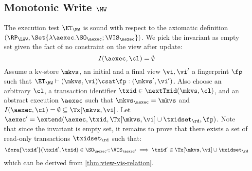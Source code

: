 \subsection{Monotonic Write \( \MW \)}
\label{sec:sound-complete-mw}

The execution test $\ET_\MW$ is sound with respect to the axiomatic definition 
$(\RP_{\LWW}, \Set{\lambda \aexec. \SO_{\aexec} ; \VIS_{\aexec} })$.
We pick the invariant as empty set given the fact of no constraint on the view after update:
\[ 
    I( \aexec, \cl ) = \emptyset 
\]
Assume a kv-store $\mkvs$, an initial and a final view $\vi, \vi'$  a fingerprint $\fp$ 
such that $\ET_{\MW} \vdash (\mkvs, \vi) \csat \fp: (\mkvs',\vi')$. 
Also choose an arbitrary $\cl$, a transaction identifier $\txid \in \nextTxid(\mkvs, \cl)$, 
and an abstract execution $\aexec$ such that $\mkvs_{\aexec} = \mkvs$ and 
\( I(\aexec, \cl) =  \emptyset \subseteq \Tx[\mkvs, \vi] \).
Let \( \aexec' = \extend(\aexec, \txid, \Tx[\mkvs, \vi] \cup \txidset_\rd, \fp ) \).
Note that since the invariant  is empty set, it remains to prove that there exists a set of read-only transactions \( \txidset_\rd \) such that:
\[
    \begin{array}{@{}l@{}}
        \fora{ \txid' }  (\txid' ,\txid)  \in \SO_{\aexec'} ; \VIS_{\aexec'}
        \implies \txid' \in \Tx[\mkvs, \vi] \cup \txidset_\rd
    \end{array}
\]
which can be derived from \cref{thm:view-vis-relation}.
